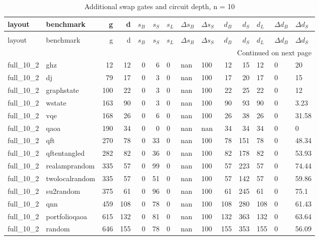 \begin{longtable}{llrrrrlllrrlll}
\caption{Additional swap gates and circuit depth, n = 10} \label{benchmark-table-10} \\
\toprule
layout & benchmark & g & d & $s_B$ & $s_S$ & $s_L$ & $\Delta s_B$ & $\Delta s_S$ & $d_B$ & $d_S$ & $d_L$ & $\Delta d_B$ & $\Delta d_S$ \\
\midrule
\endfirsthead
\caption[]{Additional swap gates and circuit depth, n = 10} \\
\toprule
layout & benchmark & g & d & $s_B$ & $s_S$ & $s_L$ & $\Delta s_B$ & $\Delta s_S$ & $d_B$ & $d_S$ & $d_L$ & $\Delta d_B$ & $\Delta d_S$ \\
\midrule
\endhead
\midrule
\multicolumn{14}{r}{Continued on next page} \\
\midrule
\endfoot
\bottomrule
\endlastfoot
full\_10\_2 & ghz & 12 & 12 & 0 & 6 & 0 & nan & 100 & 12 & 15 & 12 & 0 & 20 \\
full\_10\_2 & dj & 79 & 17 & 0 & 3 & 0 & nan & 100 & 17 & 20 & 17 & 0 & 15 \\
full\_10\_2 & graphstate & 100 & 22 & 0 & 3 & 0 & nan & 100 & 22 & 25 & 22 & 0 & 12 \\
full\_10\_2 & wstate & 163 & 90 & 0 & 3 & 0 & nan & 100 & 90 & 93 & 90 & 0 & 3.23 \\
full\_10\_2 & vqe & 168 & 26 & 0 & 6 & 0 & nan & 100 & 26 & 38 & 26 & 0 & 31.58 \\
full\_10\_2 & qaoa & 190 & 34 & 0 & 0 & 0 & nan & nan & 34 & 34 & 34 & 0 & 0 \\
full\_10\_2 & qft & 270 & 78 & 0 & 33 & 0 & nan & 100 & 78 & 151 & 78 & 0 & 48.34 \\
full\_10\_2 & qftentangled & 282 & 82 & 0 & 36 & 0 & nan & 100 & 82 & 178 & 82 & 0 & 53.93 \\
full\_10\_2 & realamprandom & 335 & 57 & 0 & 99 & 0 & nan & 100 & 57 & 223 & 57 & 0 & 74.44 \\
full\_10\_2 & twolocalrandom & 335 & 57 & 0 & 51 & 0 & nan & 100 & 57 & 142 & 57 & 0 & 59.86 \\
full\_10\_2 & su2random & 375 & 61 & 0 & 96 & 0 & nan & 100 & 61 & 245 & 61 & 0 & 75.1 \\
full\_10\_2 & qnn & 459 & 108 & 0 & 78 & 0 & nan & 100 & 108 & 280 & 108 & 0 & 61.43 \\
full\_10\_2 & portfolioqaoa & 615 & 132 & 0 & 81 & 0 & nan & 100 & 132 & 363 & 132 & 0 & 63.64 \\
full\_10\_2 & random & 646 & 155 & 0 & 78 & 0 & nan & 100 & 155 & 353 & 155 & 0 & 56.09 \\

\end{longtable}
